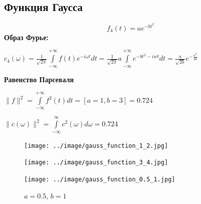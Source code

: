   \subsection{Функция Гаусса}
  \[
  f_4(t) = 
    a e^{-bt^2}
  \]
  \textbf{Образ Фурье:}  \\
  \begin{center}
    $c_4(\omega) = \frac{1}{\sqrt{2\pi}} \int\limits_{-\infty}^{+\infty}f(t)e^{-i\omega t}dt = 
  \frac{1}{\sqrt{2\pi}} a \int\limits_{-\infty}^{+\infty} e^{-bt^2 - iwt}dt = 
  \frac{a}{\sqrt{2 b}} e^{-\frac{\omega^2}{4b}}
  $ 
  \end{center} 
\noindent \textbf{Равенство Парсеваля}
\begin{center}
  $\parallel f \parallel^2 = \int\limits_{-\infty}^{+\infty} f^2(t) dt= [a = 1, b = 3] = 0.724  $
\end{center}
\begin{center}
  $\parallel c(\omega)\parallel^ 2 = \int\limits_{-\infty}^{\infty}c^2(\omega)d\omega = 0.724$
\end{center}
  \begin{figure}[!htb]
      \texttt{[image: ../image/gauss\_function\_1\_2.jpg]}
      \caption{$a=1$, $b=2$}
    \endminipage\hfill
      \texttt{[image: ../image/gauss\_function\_3\_4.jpg]}
      \caption{$a = 3$, $b = 4$}
    \endminipage\hfill
      \texttt{[image: ../image/gauss\_function\_0.5\_1.jpg]}
      \caption{$a = 0.5$, $b = 1$}
    \endminipage
    \end{figure}
    \newpage
